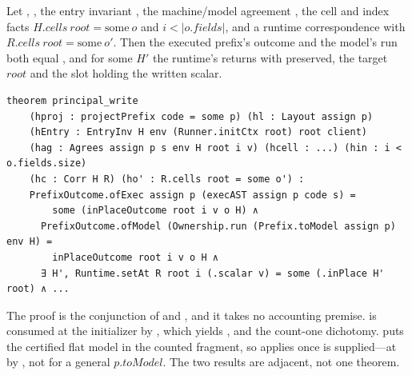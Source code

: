 \documentclass[a4paper,UKenglish,cleveref]{lipics-v2021}
\begin{document}
\begin{theorem}\label{thm:principal-write}
Let , , the entry invariant
, the machine/model
agreement , the cell and index facts
$H.\mathit{cells}\ \mathit{root} = \mathrm{some}\ o$ and $i < |o.\mathit{fields}|$,
and a runtime correspondence  with
$R.\mathit{cells}\ \mathit{root} = \mathrm{some}\ o'$. Then the executed prefix's
outcome and the model's run both equal , and for
some $H'$ the runtime's  returns  with
 preserved, the target $root$ and the slot holding the written scalar.
\end{theorem}
\begin{lstlisting}
theorem principal_write
    (hproj : projectPrefix code = some p) (hl : Layout assign p)
    (hEntry : EntryInv H env (Runner.initCtx root) root client)
    (hag : Agrees assign p s env H root i v) (hcell : ...) (hin : i < o.fields.size)
    (hc : Corr H R) (ho' : R.cells root = some o') :
    PrefixOutcome.ofExec assign p (execAST assign p code s) =
        some (inPlaceOutcome root i v o H) ∧
      PrefixOutcome.ofModel (Ownership.run (Prefix.toModel assign p) env H) =
        inPlaceOutcome root i v o H ∧
      ∃ H', Runtime.setAt R root i (.scalar v) = some (.inPlace H' root) ∧ ...
\end{lstlisting}
The proof is the conjunction of  and
, and it takes no accounting premise.
 is consumed at the initializer by ,
which yields ,  and the count-one
dichotomy.  puts the certified flat model in the
counted fragment, so  applies once  is
supplied---at  by , not for a general
$p.\mathit{toModel}$. The two results are adjacent, not one theorem.
\end{document}
